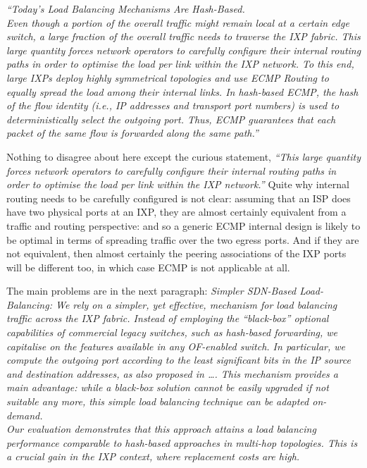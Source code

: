 \emph{“Today's Load Balancing Mechanisms Are Hash-Based.
	\\
	Even though a portion of the overall traffic might remain local at a certain edge switch, a large fraction of the overall traffic needs to traverse the IXP fabric. This large quantity forces network operators to carefully configure their internal routing paths in order to optimise the load per link within the IXP network.
	To this end, large IXPs deploy highly symmetrical topologies and use ECMP Routing to equally spread the load among their internal links. In hash-based ECMP, the hash of the flow identity (i.e., IP addresses and transport port numbers) is used to deterministically select the outgoing port. Thus, ECMP guarantees that each packet of the same flow is forwarded along the same path.”}

    
\smallskip

Nothing to disagree about here except the curious statement, \emph{“This large quantity forces network operators to carefully configure their internal routing paths in order to optimise the load per link within the IXP network.”}
Quite why internal routing needs to be carefully configured is not clear:  assuming that an ISP does have two physical ports at an IXP, they are almost certainly equivalent from a traffic and routing perspective: and so a generic ECMP internal design is likely to be optimal in terms of spreading traffic over the two egress ports.
And if they are not equivalent, then almost certainly the peering associations of the IXP ports will be different too, in which case ECMP is not applicable at all.

\smallskip


The main problems are in the next paragraph:
\textit{Simpler SDN-Based Load-Balancing: We rely on a simpler, yet effective, mechanism for load balancing traffic across the IXP fabric. Instead of employing the “black-box” optional capabilities of commercial legacy switches, such as hash-based forwarding, we capitalise on the features available in any OF-enabled switch. In particular, we compute the outgoing port according to the least significant bits in the IP source and destination addresses, as also proposed in \ldots. This mechanism provides a main advantage: while a black-box solution cannot be easily upgraded if not suitable any more, this simple load balancing technique can be adapted on-demand.
\\
Our evaluation demonstrates that this approach attains a load balancing performance comparable to hash-based approaches in multi-hop topologies. This is a crucial gain in the IXP context, where replacement costs are high.}

